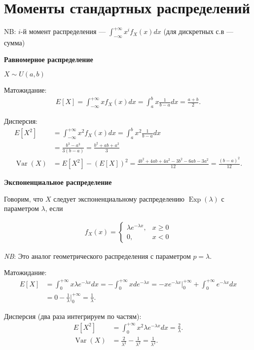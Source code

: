 \documentclass[12pt]{article}
\DeclareMathOperator{\Exp}{Exp}
\DeclareMathOperator{\Var}{Var}
\begin{document}
  \section{Моменты стандартных распределений}

  {NB:} $i$-й момент распределения --- $\int_{-\infty}^{+\infty} x^i f_X(x) dx$ (для дискретных с.в --- сумма)

  \textbf{Равномерное распределение}

  $X \sim U(a, b)$ 

  Матожидание:
  \begin{align*}
    E[X] = \int_{-\infty}^{+\infty} x f_X(x) dx = \int_{a}^{b} x \frac{1}{b - a} dx = \frac{a + b}{2}. 
  \end{align*}

  Дисперсия:
  \begin{align*}
    E[X^2] &= \int_{-\infty}^{+\infty} x^2 f_X(x) dx = \int_{a}^{b} x^2 \frac{1}{b - a} dx \\
           &= \frac{b^3 - a^3}{3(b - a)} = \frac{b^2 + ab + a^2}{3}\\
    \Var(X) &= E[X^2] - (E[X])^2 = \frac{4b^2 + 4ab + 4a^2 - 3b^2 - 6ab - 3a^2}{12} = \frac{(b - a)^2}{12}. 
  \end{align*}

  \textbf{Экспоненциальное распределение}

  Говорим, что $X$ следует экспоненциальному распределению $\Exp(\lambda)$ с параметром $\lambda$, если

  \begin{align*}
    f_X(x) = \begin{cases}
      \lambda e^{-\lambda x}, &x \ge 0 \\
      0, &x < 0
    \end{cases}
  \end{align*}

  \emph{NB}: Это аналог геометрического распределения с параметром $p = \lambda$.

  Матожидание:
  \begin{align*}
    E[X] &= \int_0^{+\infty} x \lambda e^{-\lambda x} dx = - \int_0^{+\infty} x d e^{-\lambda x} = - x e^{-\lambda x} \bigg|_0^{+\infty} + \int_0^{+\infty} e^{-\lambda x} dx \\
    &= 0 - \frac{1}{\lambda} \bigg|_0^{+\infty} = \frac{1}{\lambda}.
  \end{align*}

  Дисперсия (два раза интегрируем по частям):
  \begin{align*}
    E[X^2] &= \int_0^{+\infty} x^2 \lambda e^{-\lambda x} dx = \frac{2}{\lambda}. \\
    \Var(X) &= \frac{2}{\lambda^2} - \frac{1}{\lambda^2} = \frac{1}{\lambda^2}.
  \end{align*}
\end{document}
